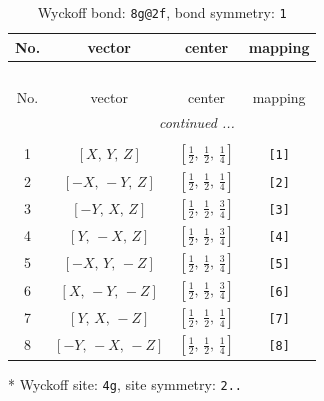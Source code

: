 \documentclass[fleqn,8pt]{jsarticle}
\begin{document}
\begin{longtable}{cccc}
\caption{Wyckoff bond: {\tt 8g@2f}, bond symmetry: {\tt 1}}
 \\
 \hline \hline
No. & vector & center & mapping \\ \hline \endfirsthead

\multicolumn{3}{l}{\tablename\ \thetable{}} \\
 \hline \hline
No. & vector & center & mapping \\ \hline \endhead

 \hline \hline
\multicolumn{3}{r}{\footnotesize\it continued ...} \\ \endfoot

 \hline \hline
\multicolumn{3}{r}{} \\ \endlastfoot

1 & $\left[ X,\, Y,\, Z \right]$ & $\left[ \frac{1}{2},\, \frac{1}{2},\, \frac{1}{4} \right]$ & {\tt [1]} \\ \hline
2 & $\left[ - X,\, - Y,\, Z \right]$ & $\left[ \frac{1}{2},\, \frac{1}{2},\, \frac{1}{4} \right]$ & {\tt [2]} \\ \hline
3 & $\left[ - Y,\, X,\, Z \right]$ & $\left[ \frac{1}{2},\, \frac{1}{2},\, \frac{3}{4} \right]$ & {\tt [3]} \\ \hline
4 & $\left[ Y,\, - X,\, Z \right]$ & $\left[ \frac{1}{2},\, \frac{1}{2},\, \frac{3}{4} \right]$ & {\tt [4]} \\ \hline
5 & $\left[ - X,\, Y,\, - Z \right]$ & $\left[ \frac{1}{2},\, \frac{1}{2},\, \frac{3}{4} \right]$ & {\tt [5]} \\ \hline
6 & $\left[ X,\, - Y,\, - Z \right]$ & $\left[ \frac{1}{2},\, \frac{1}{2},\, \frac{3}{4} \right]$ & {\tt [6]} \\ \hline
7 & $\left[ Y,\, X,\, - Z \right]$ & $\left[ \frac{1}{2},\, \frac{1}{2},\, \frac{1}{4} \right]$ & {\tt [7]} \\ \hline
8 & $\left[ - Y,\, - X,\, - Z \right]$ & $\left[ \frac{1}{2},\, \frac{1}{2},\, \frac{1}{4} \right]$ & {\tt [8]} \\
\end{longtable}
* Wyckoff site: {\tt 4g}, site symmetry: {\tt 2..}
\renewcommand{\arraystretch}{1.2}
\end{document}
